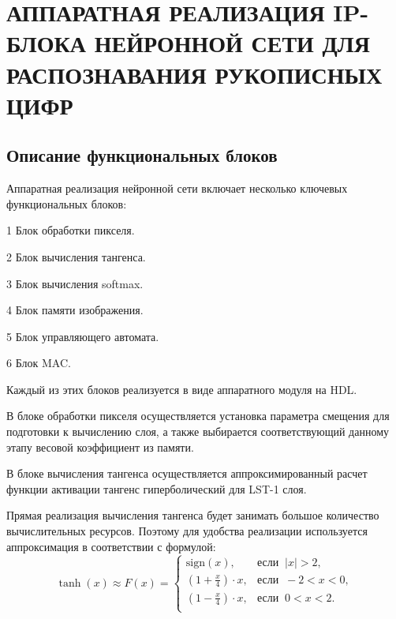 \chapter[Аппаратная реализация IP-блока нейронной сети для распознавания рукописных цифр]
{АППАРАТНАЯ РЕАЛИЗАЦИЯ IP-БЛОКА НЕЙРОННОЙ СЕТИ ДЛЯ РАСПОЗНАВАНИЯ РУКОПИСНЫХ ЦИФР}

\section{Описание функциональных блоков}
\hspace*{12.5 mm}Аппаратная реализация нейронной сети включает несколько 
ключевых функциональных блоков:

  1 Блок обработки пикселя.

  2 Блок вычисления тангенса.

  3 Блок вычисления softmax.

  4 Блок памяти изображения.

  5 Блок управляющего автомата.

  6 Блок MAC.

Каждый из этих блоков реализуется в виде аппаратного модуля на HDL.\@

В блоке обработки пикселя осуществляется установка параметра смещения для 
подготовки к вычислению слоя, а также выбирается соответствующий данному этапу 
весовой коэффициент из памяти.

В блоке вычисления тангенса осуществляется аппроксимированный расчет функции 
активации тангенс гиперболический для LST-1 слоя.

Прямая реализация вычисления тангенса будет занимать большое количество 
вычислительных ресурсов. Поэтому для удобства реализации используется 
аппроксимация в соответствии с формулой\cite{TANH}:
\vspace{1mm}
\begin{equation}
    \tanh{(x)}\approx F(x) = 
      \begin{cases}
      \mathrm{sign}(x),         & \mathrm{\text{если}}\;\;  |x|>2, \\
      (1 + \frac{x}{4})\cdot x, & \mathrm{\text{если}}\;\; -2<x<0, \\
      (1 - \frac{x}{4})\cdot x, & \mathrm{\text{если}}\;\;  0<x<2. \\
      \end{cases}
\end{equation}
\vspace{1mm}

